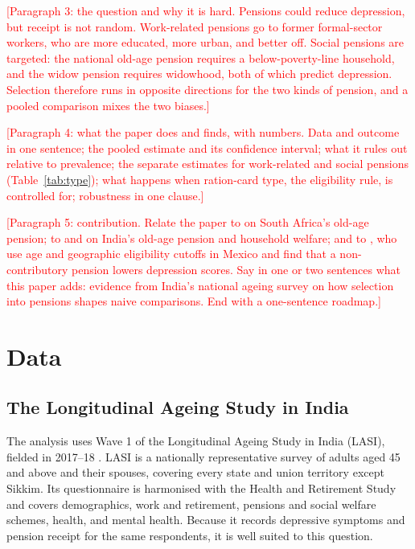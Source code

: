 \documentclass[11pt]{article}
\newcommand{\todo}[1]{\textcolor{red}{[#1]}}
\begin{document}
\todo{Paragraph 3: the question and why it is hard. Pensions could reduce
depression, but receipt is not random. Work-related pensions go to former
formal-sector workers, who are more educated, more urban, and better off.
Social pensions are targeted: the national old-age pension requires a
below-poverty-line household, and the widow pension requires widowhood, both of
which predict depression. Selection therefore runs in opposite directions for
the two kinds of pension, and a pooled comparison mixes the two biases.}

\todo{Paragraph 4: what the paper does and finds, with numbers. Data and
outcome in one sentence; the pooled estimate and its confidence interval; what
it rules out relative to prevalence; the separate estimates for work-related
and social pensions (Table~\ref{tab:type}); what happens when ration-card type,
the eligibility rule, is controlled for; robustness in one clause.}

\todo{Paragraph 5: contribution. Relate the paper to \citet{CaseDeaton1998} on
South Africa's old-age pension; to \citet{Kaushal2014} and
\citet{UnnikrishnanImai2020} on India's old-age pension and household welfare;
and to \citet{GalianiGertlerBando2016}, who use age and geographic eligibility
cutoffs in Mexico and find that a non-contributory pension lowers depression
scores. Say in one or two sentences what this paper adds: evidence from India's
national ageing survey on how selection into pensions shapes naive
comparisons. End with a one-sentence roadmap.}

\section{Data}

\subsection{The Longitudinal Ageing Study in India}

The analysis uses Wave 1 of the Longitudinal Ageing Study in India (LASI),
fielded in 2017--18 \citep{IIPS2020report, IIPS2020guide}. LASI is a nationally
representative survey of adults aged 45 and above and their spouses, covering
every state and union territory except Sikkim. Its questionnaire is harmonised
with the Health and Retirement Study and covers demographics, work and
retirement, pensions and social welfare schemes, health, and mental health.
Because it records depressive symptoms and pension receipt for the same
respondents, it is well suited to this question.
\end{document}
